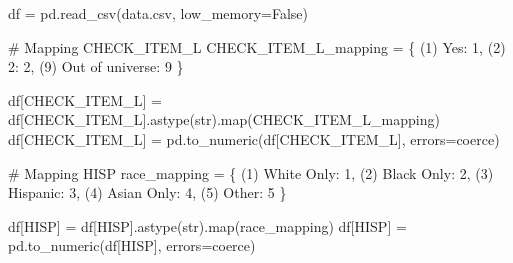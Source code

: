\documentclass[
  letterpaper,
  DIV=11,
  numbers=noendperiod]{scrreprt}
\newenvironment{Shaded}{\begin{snugshade}}{\end{snugshade}}
\newcommand{\BuiltInTok}[1]{\textcolor[rgb]{0.00,0.23,0.31}{#1}}
\newcommand{\CommentTok}[1]{\textcolor[rgb]{0.37,0.37,0.37}{#1}}
\newcommand{\DecValTok}[1]{\textcolor[rgb]{0.68,0.00,0.00}{#1}}
\newcommand{\NormalTok}[1]{\textcolor[rgb]{0.00,0.23,0.31}{#1}}
\newcommand{\OperatorTok}[1]{\textcolor[rgb]{0.37,0.37,0.37}{#1}}
\newcommand{\StringTok}[1]{\textcolor[rgb]{0.13,0.47,0.30}{#1}}
\newcommand{\VariableTok}[1]{\textcolor[rgb]{0.07,0.07,0.07}{#1}}
\begin{document}
\begin{Shaded}
\begin{Highlighting}[]
\NormalTok{df }\OperatorTok{=}\NormalTok{ pd.read\_csv(}\StringTok{\textquotesingle{}data.csv\textquotesingle{}}\NormalTok{, low\_memory}\OperatorTok{=}\VariableTok{False}\NormalTok{)}

\CommentTok{\# Mapping CHECK\_ITEM\_L}
\NormalTok{CHECK\_ITEM\_L\_mapping }\OperatorTok{=}\NormalTok{ \{}
    \StringTok{\textquotesingle{}(1) Yes\textquotesingle{}}\NormalTok{: }\DecValTok{1}\NormalTok{,}
    \StringTok{\textquotesingle{}(2) 2\textquotesingle{}}\NormalTok{: }\DecValTok{2}\NormalTok{,}
    \StringTok{\textquotesingle{}(9) Out of universe\textquotesingle{}}\NormalTok{: }\DecValTok{9}
\NormalTok{\}}

\NormalTok{df[}\StringTok{\textquotesingle{}CHECK\_ITEM\_L\textquotesingle{}}\NormalTok{] }\OperatorTok{=}\NormalTok{ df[}\StringTok{\textquotesingle{}CHECK\_ITEM\_L\textquotesingle{}}\NormalTok{].astype(}\BuiltInTok{str}\NormalTok{).}\BuiltInTok{map}\NormalTok{(CHECK\_ITEM\_L\_mapping)}
\NormalTok{df[}\StringTok{\textquotesingle{}CHECK\_ITEM\_L\textquotesingle{}}\NormalTok{] }\OperatorTok{=}\NormalTok{ pd.to\_numeric(df[}\StringTok{\textquotesingle{}CHECK\_ITEM\_L\textquotesingle{}}\NormalTok{], errors}\OperatorTok{=}\StringTok{\textquotesingle{}coerce\textquotesingle{}}\NormalTok{)}

\CommentTok{\# Mapping HISP}
\NormalTok{race\_mapping }\OperatorTok{=}\NormalTok{ \{}
    \StringTok{\textquotesingle{}(1) White Only\textquotesingle{}}\NormalTok{: }\DecValTok{1}\NormalTok{,}
    \StringTok{\textquotesingle{}(2) Black Only\textquotesingle{}}\NormalTok{: }\DecValTok{2}\NormalTok{,}
    \StringTok{\textquotesingle{}(3) Hispanic\textquotesingle{}}\NormalTok{: }\DecValTok{3}\NormalTok{,}
    \StringTok{\textquotesingle{}(4) Asian Only\textquotesingle{}}\NormalTok{: }\DecValTok{4}\NormalTok{,}
    \StringTok{\textquotesingle{}(5) Other\textquotesingle{}}\NormalTok{: }\DecValTok{5}
\NormalTok{\}}

\NormalTok{df[}\StringTok{\textquotesingle{}HISP\textquotesingle{}}\NormalTok{] }\OperatorTok{=}\NormalTok{ df[}\StringTok{\textquotesingle{}HISP\textquotesingle{}}\NormalTok{].astype(}\BuiltInTok{str}\NormalTok{).}\BuiltInTok{map}\NormalTok{(race\_mapping)}
\NormalTok{df[}\StringTok{\textquotesingle{}HISP\textquotesingle{}}\NormalTok{] }\OperatorTok{=}\NormalTok{ pd.to\_numeric(df[}\StringTok{\textquotesingle{}HISP\textquotesingle{}}\NormalTok{], errors}\OperatorTok{=}\StringTok{\textquotesingle{}coerce\textquotesingle{}}\NormalTok{)}


\end{Highlighting}
\end{Shaded}
\end{document}
